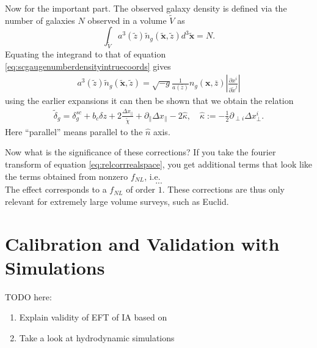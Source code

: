 \documentclass[11pt]{article}
\begin{document}
Now for the important part. The observed galaxy density is defined via the number of galaxies $N$ observed in a volume $\tilde V$ as
\begin{equation}
    \int_{\tilde V}a^3(\tilde z)\tilde n_g(\tilde {\mathbf x}, \tilde z) d^3\tilde{\mathbf x} = N.
\end{equation}
Equating the integrand to that of equation \ref{eq:scgaugenumberdensityintruecoords} gives
\begin{gather}
    a^3(\tilde z)\tilde n_g(\tilde{\mathbf x}, \tilde z) = \sqrt{-g}\frac{1}{a(\bar z)} n_g(\mathbf x, \bar z)\left | \frac{\partial x^i}{\partial\tilde x^j} \right |
\end{gather}
using the earlier expansions it can then be shown that we obtain the relation
\begin{gather}
    \tilde \delta_g = \delta^{sc}_g + b_c\delta z + 2\frac{\Delta x_\parallel}{\tilde \chi} + \partial_{\parallel}\Delta x_\parallel - 2\hat \kappa, \quad \hat \kappa := -\frac{1}{2}\partial_{\perp i}\Delta x^i_{\perp}.
    \label{eq:relcorrrealspace}
\end{gather}
Here ``parallel'' means parallel to the $\hat n$ axis.

Now what is the significance of these corrections? If you take the fourier transform of equation \ref{eq:relcorrrealspace}, you get additional terms that look like the terms obtained from nonzero $f_{NL}$, i.e.
\begin{equation}
    ...
\end{equation}
The effect corresponds to a $f_{NL}$ of order $1$. These corrections are thus only relevant for extremely large volume surveys, such as Euclid.

\section{Calibration and Validation with Simulations}
TODO here:
\begin{enumerate}
    \item Explain validity of EFT of IA based on \cite{bakx2023effectivefieldtheoryintrinsic}
    \item Take a look at hydrodynamic simulations \cite{Samuroff_2021, Johnston_2023}
\end{enumerate}


\printbibliography
\end{document}
